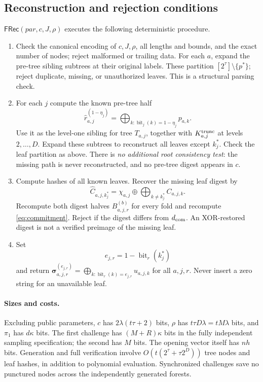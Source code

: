 \documentclass[11pt]{article}
\theoremstyle{plain}
\theoremstyle{definition}
\theoremstyle{remark}
\newcommand{\Rec}{\mathsf{FRec}}
\begin{document}
\subsection{Reconstruction and rejection conditions}
$\Rec(par,c,J,\rho)$ executes the following deterministic procedure.
\begin{enumerate}
\item Check the canonical encoding of $c,J,\rho$, all lengths and bounds,
and the exact number of nodes; reject malformed or trailing data.
For each $a$, expand the pre-tree sibling subtrees at their original labels.
These partition $[2^\tau]\setminus\{p^*\}$; reject duplicate, missing,
or unauthorized leaves. This is a structural parsing check.
\item For each $j$ compute the known pre-tree half
\[
 \widehat r_{a,j}^{(1-\eta_j)}=
 \bigoplus_{k:\operatorname{bit}_j(k)=1-\eta_j}p_{a,k}.
\]
Use it as the level-one sibling for tree $T_{a,j}$, together with
$K_{a,j}^{\rm trunc}$ at levels $2,\ldots,D$.
Expand these subtrees to reconstruct all leaves except $k_j^*$.
Check the leaf partition as above. There is \emph{no additional root
consistency test}: the missing path is never reconstructed, and no
pre-tree digest appears in $c$.
\item Compute hashes of all known leaves. Recover the missing leaf digest by
\begin{equation}\label{eq:missinghash}
 \widehat C_{a,j,k_j^*}=\chi_{a,j}\oplus
                   \bigoplus_{k\ne k_j^*}C_{a,j,k}.
\end{equation}
Recompute both digest halves $B_{a,j,r}^{(b)}$ for every fold and recompute
\cref{eq:commitment}. Reject if the digest differs from $d_{\rm com}$.
An XOR-restored digest is not a verified preimage of the missing leaf.
\item Set
\begin{equation}\label{eq:knownbit}
 e_{j,r}=1-\operatorname{bit}_r(k_j^*)
\end{equation}
and return
$\boldsymbol\sigma_{a,j,r}^{(e_{j,r})}=\bigoplus_{k:
\operatorname{bit}_r(k)=e_{j,r}}u_{a,j,k}$ for all $a,j,r$.
Never insert a zero string for an unavailable leaf.
\end{enumerate}

\paragraph{Sizes and costs.}
Excluding public parameters, $c$ has $2\lambda(t\tau+2)$ bits,
$\rho$ has $t\tau D\lambda=tM\lambda$ bits, and $\pi_1$ has $d\kappa$
bits. The first challenge has $(M+R)\kappa$ bits in the fully independent
sampling specification; the second has $M$ bits. The opening vector itself
has $nh$ bits.
Generation and full verification involve $O(t(2^\tau+\tau2^D))$ tree
nodes and leaf hashes, in addition to polynomial evaluation. Synchronized
challenges save no punctured nodes across the independently generated forests.
\end{document}
